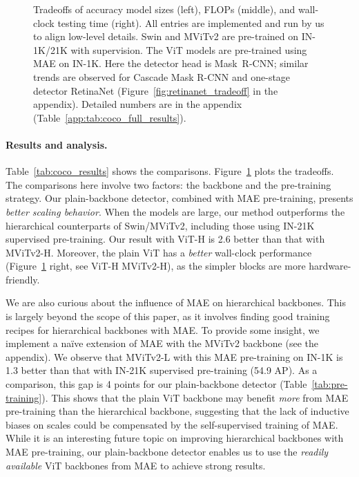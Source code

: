 \documentclass[runningheads]{llncs}
\newcommand{\boxAP}{AP\xspace}
\begin{document}
\begin{figure}[t]
\vspace{-1em}
\newcommand{\sz}{0.295}
\vspace{-.5em}
\caption{Tradeoffs of accuracy \vs model sizes (left), FLOPs (middle), and wall-clock testing time (right).
All entries are implemented and run by us to align low-level details.
Swin \cite{Liu2021} and MViTv2 \cite{Li2021a} are pre-trained on IN-1K/21K with supervision. The ViT models are pre-trained using MAE \cite{He2021} on IN-1K.
Here the detector head is \mbox{Mask R-CNN}; similar trends are observed for Cascade Mask R-CNN and one-stage detector RetinaNet (Figure~\ref{fig:retinanet_tradeoff} in the appendix). Detailed numbers are in the appendix (Table~\ref{app:tab:coco_full_results}).
\label{fig:tradeoff}
}
\vspace{-1.5em}
\end{figure}

\paragraph{Results and analysis.} Table~\ref{tab:coco_results} shows the comparisons.
Figure~\ref{fig:tradeoff} plots the tradeoffs.
The comparisons here involve two factors: the backbone and the pre-training strategy. Our plain-backbone detector, combined with MAE pre-training, presents \textit{better scaling behavior}. When the models are large, our method outperforms the hierarchical counterparts of Swin/MViTv2, including those using IN-21K supervised pre-training. Our result with ViT-H is 2.6 better than that with MViTv2-H. Moreover, the plain ViT has a \textit{better} wall-clock performance (Figure~\ref{fig:tradeoff} right, see ViT-H \vs MViTv2-H), as the {simpler} blocks are more hardware-friendly.

We are also curious about the influence of MAE on hierarchical backbones. This is largely beyond the scope of this paper, as it involves finding good training recipes for hierarchical backbones with MAE.
To provide some insight, we implement a na\"ive extension of MAE with the MViTv2 backbone (see the appendix). We observe that MViTv2-L with this MAE pre-training on IN-1K is 1.3 better than that with IN-21K supervised pre-training (54.9  \boxAP). As a comparison, this gap is 4 points for our plain-backbone detector (Table~\ref{tab:pre-training}). This shows that the plain ViT backbone may benefit \textit{more} from MAE pre-training than the hierarchical backbone, suggesting that the lack of inductive biases on scales could be compensated by the self-supervised training of MAE.
While it is an interesting future topic on improving hierarchical backbones with MAE pre-training, our plain-backbone detector enables us to use the \textit{readily available} ViT backbones from MAE to achieve strong results.
\end{document}
